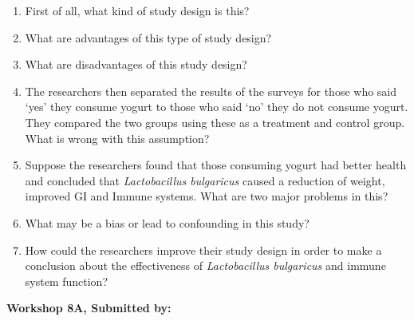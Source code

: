 \documentclass[11pt]{book}\usepackage[]{graphicx}\usepackage[]{color}
\begin{document}
\begin{exercises}
\begin{exercise}
\begin{enumerate}
  \item First of all, what kind of study design is this?
  \item What are advantages of this type of study design?
  \item What are disadvantages of this study design?
  \item	The researchers then separated the results of the surveys for those who said `yes' they consume yogurt to those who said `no' they do not consume yogurt.  They compared the two groups using these as a treatment and control group.  What is wrong with this assumption?
  \item	Suppose the researchers found that those consuming yogurt had better health and concluded that \textit{Lactobacillus bulgaricus} caused a reduction of weight, improved GI and Immune systems.  What are two major problems in this?
  \item	What may be a bias or lead to confounding in this study?
  \item	How could the researchers improve their study design in order to make a conclusion about the effectiveness of \textit{Lactobacillus bulgaricus} and immune system function?
\end{enumerate}

\end{exercise}
\begin{solution}  %

\end{solution}

\clearpage

    \begin{exercise}  %

    \begin{center}
\begin{flushleft}\textbf{\large \hfill Workshop 8A, Submitted by: }\end{flushleft}

\end{center}
\end{exercise}
\end{exercises}
\end{document}
